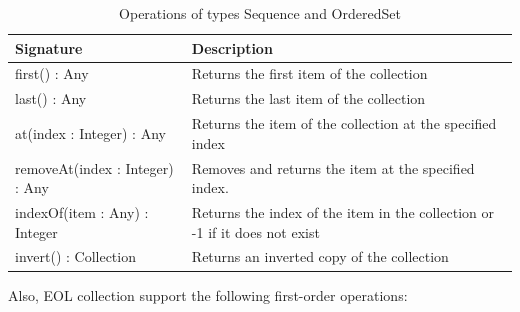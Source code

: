 \begin{longtable} {|p{5.5cm}|p{6.5cm}|}
			
			\caption{Operations of types Sequence and OrderedSet}
			\label{tab:SortedOperations}\\
			
			\hline
							
			\textbf{Signature} & \textbf{Description} \\\hline

			first() : Any & Returns the first item of the collection  \\\hline
				
			last() : Any & Returns the last item of the collection  \\\hline
	
			at(index : Integer) : Any & Returns the item of the collection at the specified index \\\hline
			
			removeAt(index : Integer) : Any & Removes and returns the item at the specified index. \\\hline
			
			indexOf(item : Any) : Integer & Returns the index of the item in the collection or -1 if it does not exist \\\hline

			invert() : Collection & Returns an inverted copy of the collection\\\hline
						
\end{longtable}

Also, EOL collection support the following first-order operations:

